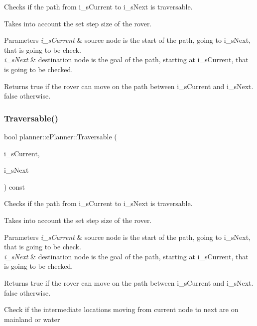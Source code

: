 Checks if the path from i\+\_\+s\+Current to i\+\_\+s\+Next is traversable. 

Takes into account the set step size of the rover.


\begin{DoxyParams}{Parameters}
{\em i\+\_\+s\+Current} & source node is the start of the path, going to i\+\_\+s\+Next, that is going to be check. \\
\hline
{\em i\+\_\+s\+Next} & destination node is the goal of the path, starting at i\+\_\+s\+Current, that is going to be checked. \\
\hline
\end{DoxyParams}
\begin{DoxyReturn}{Returns}
true if the rover can move on the path between i\+\_\+s\+Current and i\+\_\+s\+Next. false otherwise. 
\end{DoxyReturn}
\mbox{\label{classplanner_1_1c_planner_ab17c52bf6dd433b8f392a5bf2bc4b9a1}} 
\subsubsection{\texorpdfstring{Traversable()}{Traversable()}\hspace{0.1cm}{\footnotesize\ttfamily [2/2]}}
{\footnotesize\ttfamily bool planner\+::c\+Planner\+::\+Traversable (\begin{DoxyParamCaption}\item[{std\+::shared\+\_\+ptr$<$ \mbox{\hyperlink{structplanner_1_1t_node}{t\+Node}} $>$}]{i\+\_\+s\+Current,  }\item[{std\+::shared\+\_\+ptr$<$ \mbox{\hyperlink{structplanner_1_1t_node}{t\+Node}} $>$}]{i\+\_\+s\+Next }\end{DoxyParamCaption}) const}



Checks if the path from i\+\_\+s\+Current to i\+\_\+s\+Next is traversable. 

Takes into account the set step size of the rover.


\begin{DoxyParams}{Parameters}
{\em i\+\_\+s\+Current} & source node is the start of the path, going to i\+\_\+s\+Next, that is going to be check. \\
\hline
{\em i\+\_\+s\+Next} & destination node is the goal of the path, starting at i\+\_\+s\+Current, that is going to be checked. \\
\hline
\end{DoxyParams}
\begin{DoxyReturn}{Returns}
true if the rover can move on the path between i\+\_\+s\+Current and i\+\_\+s\+Next. false otherwise. 
\end{DoxyReturn}
Check if the intermediate locations moving from current node to next are on mainland or water


